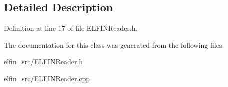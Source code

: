 \subsection{Detailed Description}


Definition at line 17 of file E\-L\-F\-I\-N\-Reader.\-h.



The documentation for this class was generated from the following files\-:\begin{DoxyCompactItemize}
\item 
elfin\-\_\-src/E\-L\-F\-I\-N\-Reader.\-h\item 
elfin\-\_\-src/E\-L\-F\-I\-N\-Reader.\-cpp\end{DoxyCompactItemize}
